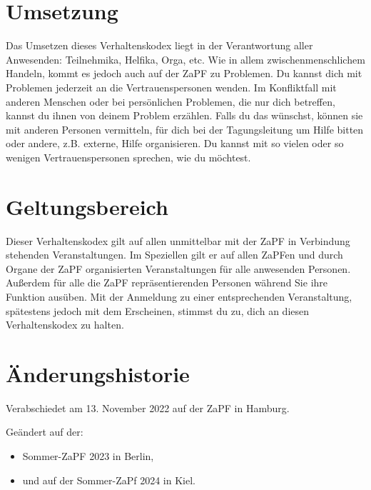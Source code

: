 \documentclass[
  a4paper,
  oneside]{scrartcl}
\providecommand{\tightlist}{%
  \setlength{\itemsep}{0pt}\setlength{\parskip}{0pt}}
\begin{document}
\section{Umsetzung}\label{umsetzung}

Das Umsetzen dieses Verhaltenskodex liegt in der Verantwortung aller
Anwesenden: Teilnehmika, Helfika, Orga, etc. Wie in allem
zwischenmenschlichem Handeln, kommt es jedoch auch auf der ZaPF zu
Problemen. Du kannst dich mit Problemen jederzeit an die
Vertrauenspersonen wenden. Im Konfliktfall mit anderen Menschen oder bei
persönlichen Problemen, die nur dich betreffen, kannst du ihnen von
deinem Problem erzählen. Falls du das wünschst, können sie mit anderen
Personen vermitteln, für dich bei der Tagungsleitung um Hilfe bitten
oder andere, z.B. externe, Hilfe organisieren. Du kannst mit so vielen
oder so wenigen Vertrauenspersonen sprechen, wie du möchtest.

\section{Geltungsbereich}\label{geltungsbereich}

Dieser Verhaltenskodex gilt auf allen unmittelbar mit der ZaPF in
Verbindung stehenden Veranstaltungen. Im Speziellen gilt er auf allen
ZaPFen und durch Organe der ZaPF organisierten Veranstaltungen für alle
anwesenden Personen. Außerdem für alle die ZaPF repräsentierenden
Personen während Sie ihre Funktion ausüben. Mit der Anmeldung zu einer
entsprechenden Veranstaltung, spätestens jedoch mit dem Erscheinen,
stimmst du zu, dich an diesen Verhaltenskodex zu halten.

\section{Änderungshistorie}\label{uxe4nderungshistorie}

Verabschiedet am 13. November 2022 auf der ZaPF in Hamburg.

Geändert auf der:

\begin{itemize}
\tightlist
\item
  Sommer-ZaPF 2023 in Berlin,
\item
  und auf der Sommer-ZaPf 2024 in Kiel.
\end{itemize}
\end{document}

